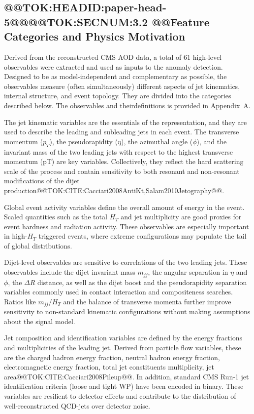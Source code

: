 \documentclass[11pt]{article}
\begin{document}
\subsection{@@TOK:HEADID:paper-head-5@@@@TOK:SECNUM:3.2 @@Feature Categories and Physics Motivation}

Derived from the reconstructed CMS AOD data, a total of $61$ high-level observables were extracted and used as inputs to the anomaly detection. Designed to be as model-independent and complementary as possible, the observables measure (often simultaneously) different aspects of jet kinematics, internal structure, and event topology. They are divided into the categories described below. The observables and theirdefinitions is provided in Appendix~A.

The jet kinematic variables are the essentials of the representation, and they are used to describe the leading and subleading jets in each event. The transverse momentum ($p_T$), the pseudorapidity ($\eta$), the azimuthal angle ($\phi$), and the invariant mass of the two leading jets with respect to the highest transverse momentum (pT) are key variables. Collectively, they reflect the hard scattering scale of the process and contain sensitivity to both resonant and non-resonant modifications of the dijet production@@TOK:CITE:Cacciari2008AntiKt,Salam2010Jetography@@.

Global event activity variables define the overall amount of energy in the event. Scaled quantities such as the total $H_T$ and jet multiplicity are good proxies for event hardness and radiation activity. These observables are especially important in high-$H_T$ triggered events, where extreme configurations may populate the tail of global distributions.

Dijet-level observables are sensitive to correlations of the two leading jets. These observables include the dijet invariant mass $m_{jj}$, the angular separation in $\eta$ and $\phi$, the $\Delta R$ distance, as well as the dijet boost and the pseudorapidity separation variables commonly used in contact interaction and compositeness searches. Ratios like $m_{jj}/H_T$ and the balance of transverse momenta further improve sensitivity to non-standard kinematic configurations without making assumptions about the signal model.

Jet composition and identification variables are defined by the energy fractions and multiplicities of the leading jet. Derived from particle flow variables, these are the charged hadron energy fraction, neutral hadron energy fraction, electromagnetic energy fraction, total jet constituents multiplicity, jet area@@TOK:CITE:Cacciari2008Pileup@@. In addition, standard CMS Run-1 jet identification criteria (loose and tight WP) have been encoded in binary. These variables are resilient to detector effects and contribute to the distribution of well-reconstructed QCD-jets over detector noise.
\end{document}
